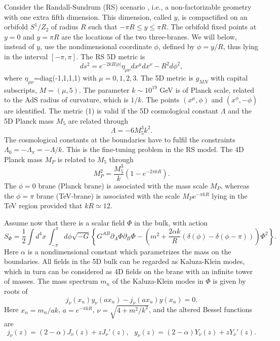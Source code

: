 \documentclass[a4paper,12pt]{article}
\begin{document}
Consider the Randall-Sundrum (RS) scenario \cite{randall99}, i.e., a non-factorizable geometry with one extra fifth dimension. This dimension, called $y$, is compactified on an orbifold $S^1/Z_2$ of radius $R$ such that $-\pi R \leq y \leq \pi R$. The orbifold fixed points at $y=0$ and $y=\pi R$ are the locations of the two three-branes. We will below, instead of $y$, use the nondimensional coordinate $\phi$, defined by $\phi=y/R$, thus lying in the interval $[-\pi, \pi]$. The RS  5D metric is
\begin{equation}
ds^2=e^{-2kR|\phi|}\eta_{\mu\nu} dx^\mu dx^\nu -R^2 d\phi^2,
\end{equation}
\label{1}
where $\eta_{\mu\nu}$=diag(-1,1,1,1) with $\mu=0,1,2,3$. The 5D metric is $g_{MN}$ with capital subscripts, $M=(\mu, 5)$. The parameter $k \sim 10^{19}$ GeV is of Planck scale, related to the AdS radius of curvature, which is $1/k$. The points $(x^\mu,\phi)$ and $(x^\phi, -\phi)$ are identified. The metric (1) is valid if the 5D cosmological constant $\Lambda$ and the 5D Planck mass $M_5$ are related through 
\begin{equation}
\Lambda=-6M_5^3k^2.
\end{equation}
\label{2}
The cosmological constants at the boundaries have to fulfil the constraints $\Lambda_{0}=-\Lambda_{\pi}=-\Lambda/k$. This is the fine-tuning problem in the RS model. The 4D Planck mass $M_P$ is related to $M_5$ through
\begin{equation}
M_P^2=\frac{M_5^3}{k}\left( 1-e^{-2\pi kR} \right).
\end{equation}
\label{3}
The $\phi=0$ brane (Planck brane) is associated with the mass scale $M_P$, whereas the $\phi=\pi$ brane (TeV-brane) is associated with the scale $M_P e^{-\pi kR}$ lying in the TeV region provided that $kR \simeq 12$.

Assume now that there is a scalar field $\Phi$ in the bulk, with action
\begin{equation}
S_\Phi=\frac{1}{2}\int d^4 x\, \int_{-\pi}^{\pi} d\phi \sqrt{-G}\left\{ G^{AB}\partial_A \Phi \partial_B \Phi
-\left(m^2+\frac{2\alpha k}{R}(\delta(\phi)-\delta(\phi-\pi))\right) \Phi^2 \right\}.
\end{equation}
\label{4}
Here $\alpha$ is a nondimensional constant which parametrizes the mass on the boundaries. All fields in the 5D bulk can be regarded as Kaluza-Klein modes, which in turn can be considered as 4D fields on the brane with an infinite tower of masses. The mass spectrum $m_n$ of the Kaluza-Klein modes in $\Phi$ is given \cite{goldberger00, gherghetta00} by roots of
\begin{equation}
j_{\nu} (x_n)y_{\nu} (ax_n)-j_{\nu} (ax_n)y(x_n)=0.
\end{equation}
\label{5}
Here $x_n=m_n/ak$, $a=e^{-\pi kR}$, $\nu=\sqrt{4+m^2/k^2}$, and the altered Bessel functions are
\begin{equation}
j_\nu(z)=(2-\alpha)J_\nu(z)+zJ_\nu'(z),~~~y_\nu(z)=(2-\alpha)Y_\nu(z)+zY_\nu'(z).
\end{equation}
\label{6}
\end{document}
